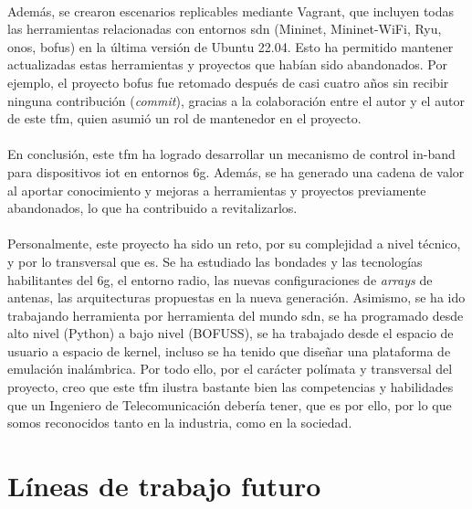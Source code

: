 \\
Además, se crearon escenarios replicables mediante Vagrant, que incluyen todas las herramientas relacionadas con entornos \gls{sdn} (Mininet, Mininet-WiFi, Ryu, \gls{onos}, \gls{bofus}) en la última versión de Ubuntu 22.04. Esto ha permitido mantener actualizadas estas herramientas y proyectos que habían sido abandonados. Por ejemplo, el proyecto \gls{bofus} fue retomado después de casi cuatro años sin recibir ninguna contribución (\textit{commit}), gracias a la colaboración entre el autor y el autor de este \gls{tfm}, quien asumió un rol de mantenedor en el proyecto.\\
\\
En conclusión, este \gls{tfm} ha logrado desarrollar un mecanismo de control in-band para dispositivos \gls{iot} en entornos \gls{6g}. Además, se ha generado una cadena de valor al aportar conocimiento y mejoras a herramientas y proyectos previamente abandonados, lo que ha contribuido a revitalizarlos.\\
\\
Personalmente, este proyecto ha sido un reto, por su complejidad a nivel técnico, y por lo transversal que es. Se ha estudiado las bondades y las tecnologías habilitantes del \gls{6g}, el entorno radio, las nuevas configuraciones de \textit{arrays} de antenas, las arquitecturas propuestas en la nueva generación. Asimismo, se ha ido trabajando herramienta por herramienta del mundo \gls{sdn}, se ha programado desde alto nivel (Python) a bajo nivel (BOFUSS), se ha trabajado desde el espacio de usuario a espacio de kernel, incluso se ha tenido que diseñar una plataforma de emulación inalámbrica. Por todo ello, por el carácter polímata y transversal del proyecto, creo que este \gls{tfm} ilustra bastante bien las competencias y habilidades que un Ingeniero de Telecomunicación debería tener, que es por ello, por lo que somos reconocidos tanto en la industria, como en la sociedad.

\newpage

\section{Líneas de trabajo futuro}
\label{trabajoFuturo}

